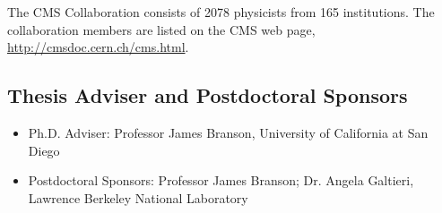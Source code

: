 \documentclass[11pt]{article}
\begin{document}
\noindent The CMS Collaboration consists of 2078 physicists from 165
  institutions. The collaboration members are listed on the CMS web page,
\href{http://cmsdoc.cern.ch/cms.html}{http://cmsdoc.cern.ch/cms.html}.

\subsection*{Thesis Adviser and Postdoctoral Sponsors}
\begin{itemize}
\item Ph.D. Adviser: Professor James Branson, University of California
  at San Diego
\item Postdoctoral Sponsors: Professor James Branson; Dr. Angela
  Galtieri, Lawrence Berkeley National Laboratory
\end{itemize}

\newpage{}
\end{document}
